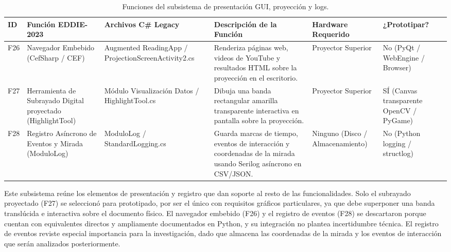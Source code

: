 \begin{table}[H]
    \centering
    \caption{Funciones del subsistema de presentación GUI, proyección y logs.}
    \label{tab:func_gui_proyeccion}
    \begin{small}
    \begin{tabular}{L{0.6cm} L{2.2cm} L{2.2cm} L{4.1cm} L{1.6cm} L{1.8cm}}
        \toprule
        ID & Función EDDIE-2023 & Archivos C\# Legacy & Descripción de la Función & Hardware Requerido & ¿Prototipar? \\ \midrule
        F26 & Navegador Embebido (CefSharp / CEF) & Augmented ReadingApp / ProjectionScreenActivity2.cs & Renderiza páginas web, videos de YouTube y resultados HTML sobre la proyección en el escritorio. & Proyector Superior & No (PyQt / WebEngine / Browser) \\ \midrule
        F27 & Herramienta de Subrayado Digital proyectado (HighlightTool) & Módulo Visualización Datos / HighlightTool.cs & Dibuja una banda rectangular amarilla transparente interactiva en pantalla sobre la proyección. & Proyector Superior & SÍ (Canvas transparente OpenCV / PyGame) \\ \midrule
        F28 & Registro Asíncrono de Eventos y Mirada (ModuloLog) & ModuloLog / StandardLogging.cs & Guarda marcas de tiempo, eventos de interacción y coordenadas de la mirada usando Serilog asíncrono en CSV/JSON. & Ninguno (Disco / Almacenamiento) & No (Python  logging /  structlog) \\ \bottomrule
    \end{tabular}
    \end{small}
\end{table}
 
Este subsistema reúne los elementos de presentación y registro que dan soporte al resto de las funcionalidades. Solo el subrayado proyectado (F27) se seleccionó para prototipado, por ser el único con requisitos gráficos particulares, ya que debe superponer una banda translúcida e interactiva sobre el documento físico. El navegador embebido (F26) y el registro de eventos (F28) se descartaron porque cuentan con equivalentes directos y ampliamente documentados en Python, y su integración no plantea incertidumbre técnica. El registro de eventos reviste especial importancia para la investigación, dado que almacena las coordenadas de la mirada y los eventos de interacción que serán analizados posteriormente.
 
